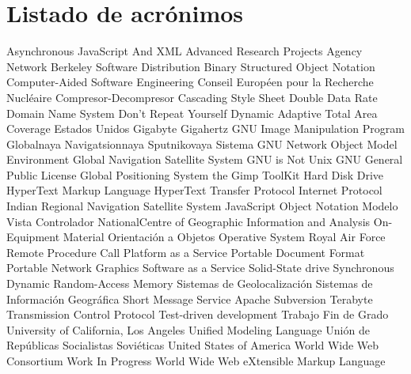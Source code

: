 \chapter{Listado de acrónimos}
\label{chap:acronimos}

\begin{acronym}
	        		{Asynchronous JavaScript And XML}
	        	{Advanced Research Projects Agency Network}
					{Berkeley Software Distribution}
					{Binary Structured Object Notation}
					{Computer-Aided Software Engineering}
	           	{Conseil Européen pour la Recherche Nucléaire}
	          	{Compresor-Decompresor}		  
	            	{Cascading Style Sheet}
	            	{Double Data Rate}
					{Domain Name System}
				  	{Don't Repeat Yourself}
	       	{Dynamic Adaptive Total Area Coverage}
	         	{Estados Unidos}
	             	{Gigabyte}
	            	{Gigahertz}
					{\acs{GNU} Image Manipulation Program}
	        	{Globalnaya Navigatsionnaya Sputnikovaya Sistema}
				{GNU Network Object Model Environment}
	           	{Global Navigation Satellite System}
	            	{\acs{GNU} is Not Unix}
					{\acs{GNU} General Public License}
	            	{Global Positioning System}
					{the Gimp ToolKit}
	            	{Hard Disk Drive}
	           	{HyperText Markup Language}
	           	{HyperText Transfer Protocol}
	             	{Internet Protocol}
	          	{Indian Regional Navigation Satellite System}
					{JavaScript Object Notation}
				   	{Modelo Vista Controlador}
	          	{NationalCentre of Geographic Information and Analysis}
					{On-Equipment Material}
	             	{Orientación a Objetos}
	             	{Operative System}
	            	{Royal Air Force}
	            	{Remote Procedure Call}
					{Platform as a Service}
					{Portable Document Format}
					{Portable Network Graphics}
					{Software as a Service}
	            	{Solid-State drive}
	          	{Synchronous Dynamic Random-Access Memory}
	             	{Sistemas de Geolocalización}
	            	{Sistemas de Información Geográfica}
	            	{Short Message Service}
					{Apache Subversion}
	             	{Terabyte}
	            	{Transmission Control Protocol}
	            	{Test-driven development}
	            	{Trabajo Fin de Grado}
	           	{University of California, Los Angeles}
					{Unified Modeling Language}
	           	{Unión de Repúblicas Socialistas Soviéticas}
	            	{United States of America}
					{World Wide Web Consortium}
	            	{Work In Progress}
	            	{World Wide Web}
					{eXtensible Markup Language}
\end{acronym}



